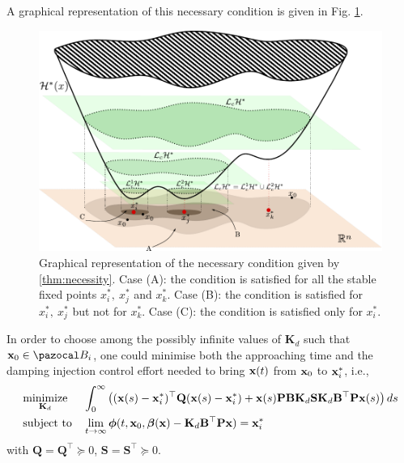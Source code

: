 %
A graphical representation of this necessary condition is given in Fig. \ref{fig:nec}.
%
\begin{figure}
    \centering
    \includegraphics[scale = 0.5]{Drawings/draw3.pdf}
    \caption{Graphical representation of the necessary condition given by \ref{thm:necessity}. Case (A): the condition is satisfied for all the stable fixed points $x_i^*,~x_j^*$ and $x_k^*$. Case (B): the condition is satisfied for $x_i^*,~x_j^*$ but not for $x_k^*$. Case (C): the condition is satisfied only for $x_i^*$.}
    \label{fig:nec}
\end{figure}
%

In order to choose among the possibly infinite values of $\mathbf{K}_d$ such that  $\xb_0\in\B_i$, one could minimise both the approaching time and the damping injection control effort needed to bring $\mathbf{x}(t)$ from $\mathbf{x}_0$ to $\mathbf{x}_i^*$, i.e.,
%
\begin{equation}
    \begin{aligned}
        & \underset{\mathbf{K}_d}{\text{minimize}}
        & & \int_0^\infty\left( (\mathbf{x}(s)-\mathbf{x}_i^*)^\top\mathbf{Q}(\mathbf{x}(s)-\mathbf{x}_i^*) + \mathbf{x}(s)\mathbf{P}\mathbf{B}\mathbf{K}_d\mathbf{S}\mathbf{K}_d\mathbf{B}^\top \mathbf{P}\mathbf{x}(s)\right)ds \\
        & \text{subject to}
        & &\lim\limits_{t\rightarrow\infty}\bm\phi(t,\mathbf{x}_0,\bm\beta(\mathbf{x})-\mathbf{K}_d\mathbf{B}^\top \mathbf{P}\mathbf{x})=\mathbf{x}^*_i
    \end{aligned}
\end{equation}
%
with $\mathbf{Q}=\mathbf{Q}^\top\succeq 0$, $\mathbf{S}=\mathbf{S}^\top\succeq 0$.
%
\clearpage
%
